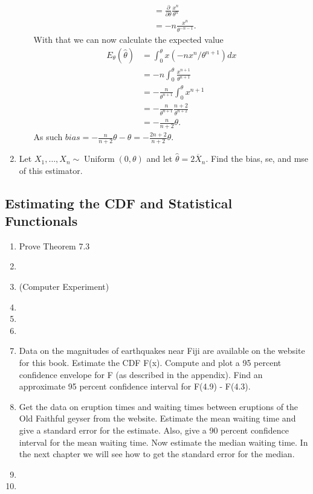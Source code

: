 \documentclass{article}
\begin{document}
\begin{enumerate}
\begin{itemize}
$$\begin{aligned}
		&= \frac{\partial}{\partial \theta} \frac{x^n}{\theta^n} \\
		&= - n \frac{x^n}{\theta^{-n - 1}}.
		\end{aligned}
		$$
		With that we can now calculate the expected value
		$$
		\begin{aligned}
		E_\theta(\hat{\theta}) &= \int_0^\theta x (-n x^n / \theta^{n + 1}) dx \\
		&= -n \int_0^\theta \frac{x^{n + 1}}{\theta^{n + 1}} \\
		&= -\frac{n}{\theta^{n + 1}} \int_0^\theta x^{n + 1} \\
		&= -\frac{n}{\theta^{n + 1}} \frac{n + 2}{\theta^{n + 2}} \\
		&= - \frac{n}{n + 2} \theta.
		\end{aligned}
		$$
		As such $bias = - \frac{n}{n + 2} \theta - \theta = - \frac{2n + 2}{n + 2} \theta$.
	\end{itemize}
\item Let $X_1, \dots, X_n \sim \operatorname{Uniform}(0, \theta)$ and let $\hat{\theta} = 2 \overline{X}_n$. Find the bias, se, and mse of this estimator.
\end{enumerate}

\subsection{Estimating the CDF and Statistical Functionals}
\begin{enumerate}
	\item Prove Theorem 7.3
	\item 
	\item (Computer Experiment)
	\item
	\item
	\item
	\item Data on the magnitudes of earthquakes near Fiji are available on the website for this book. Estimate the CDF F(x). Compute and plot a 95 percent confidence envelope for F (as described in the appendix). Find an approximate 95 percent confidence interval for F(4.9) - F(4.3).
	\item Get the data on eruption times and waiting times between eruptions of the Old Faithful geyser from the website. Estimate the mean waiting time and give a standard error for the estimate. Also, give a 90 percent confidence interval for the mean waiting time. Now estimate the median waiting time. In the next chapter we will see how to get the standard error for the median.
	\item
	\item
\end{enumerate}
\end{document}
